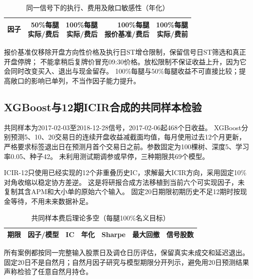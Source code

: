 \documentclass[UTF8,zihao=-4,fontset=fandol]{ctexart}
\renewcommand{\arraystretch}{1.25}
\begin{document}
\begin{table}[H]\centering\small
\caption{同一信号下的执行、费用及敞口敏感性（年化）}
\setlength{\tabcolsep}{4pt}
\begin{tabular}{lrrrr}\toprule
因子 & \shortstack{50\%每腿\\实际/费后} & \shortstack{100\%每腿\\实际/费后} & \shortstack{100\%每腿\\报价基准/费后} & \shortstack{100\%每腿\\实际/费前}\\\midrule
\bottomrule
\end{tabular}\end{table}
报价基准仅移除开盘方向性价格及执行日ST增仓限制，保留信号日ST筛选和真正开盘停牌；
不能拿稍后复牌价冒充09:30价格。放松限制不保证收益上升，因为它会同时改变买入、退出与现金留存。
100\%每腿与50\%每腿收益不可直接比较；提高敞口的影响已单列，不当作因子能力提升。

\clearpage
\subsection{XGBoost与12期ICIR合成的共同样本检验}
共同样本为2017-02-03至2018-12-28信号，2017-02-06起468个日收益。
XGBoost分别预测5、10、20交易日的连续开盘收益减截面均值，每月使用过去12个月更新，
严格要求标签退出日在预测月首个交易日之前。参数固定为100棵树、深度5、学习率0.05、种子42。
未利用测试期调参或早停，三种期限共69个模型。

ICIR-12只使用已经实现的12个非重叠历史IC，求解最大ICIR方向，采用固定10\%对角收缩以稳定协方差逆。
这是将研报合成方法移植到当前六个可实现因子，未复制其含APM和大小单的原始六个输入。
固定20日期限初期历史不足12期时按现金等待，不用未来数据补足。

\begin{table}[H]\centering\footnotesize
\caption{共同样本费后理论多空（每腿100\%名义目标）}
\setlength{\tabcolsep}{4pt}\renewcommand{\arraystretch}{1.05}
\begin{tabular}{llrrrrr}\toprule
期限 & 因子/模型 & IC & 年化 & Sharpe & 最大回撤 & 信号股数\\\midrule
\bottomrule
\end{tabular}\end{table}
所有案例都按同一完整输入股票日及调仓日历评估，保留真实未成交和延迟退出。
固定20日不是自然月；自然月因子研究与模型期限分开列示，避免用20日预测结果声称检验了任意自然月持仓。

\clearpage
\end{document}
